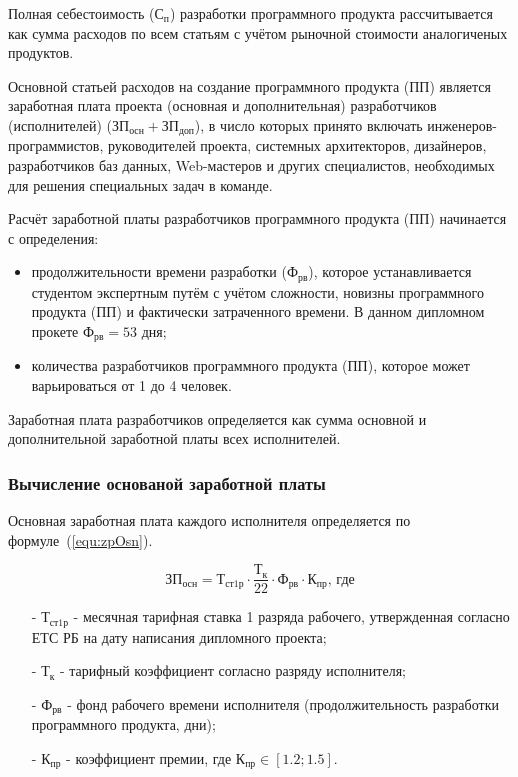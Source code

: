 Полная себестоимость ($\text{С}_{\text{п}}$) разработки программного продукта рассчитывается как сумма расходов
по всем статьям с учётом рыночной стоимости аналогиченых продуктов.

Основной статьей расходов на создание программного продукта (ПП) является заработная плата проекта
(основная и дополнительная) разработчиков (исполнителей)
($\text{ЗП}_{\text{осн}} + \text{ЗП}_{\text{доп}}$),
в число которых принято включать инженеров-программистов,
руководителей проекта, системных архитекторов, дизайнеров, разработчиков баз данных,
Web-мастеров и других специалистов, необходимых для решения специальных задач в команде.

Расчёт заработной платы разработчиков программного продукта (ПП) начинается с определения:

\begin{itemize}
    \item продолжительности времени разработки ($\text{Ф}_{\text{рв}}$),
    которое устанавливается студентом экспертным путём с учётом сложности,
    новизны программного продукта (ПП) и фактически затраченного времени.
    В данном дипломном прокете $\text{Ф}_{\text{рв}} = 53\text{ дня}$;
    \item количества разработчиков программного продукта (ПП), которое может варьироваться от 1 до 4 человек.
\end{itemize}

Заработная плата разработчиков определяется как сумма основной и дополнительной заработной платы всех исполнителей.

\subsubsection*{Вычисление основаной заработной платы}

Основная заработная плата каждого исполнителя определяется по формуле~(\ref{equ:zpOsn}).

\begin{equation}
    \label{equ:zpOsn}
    \text{ЗП}_\text{осн} = \text{Т}_\text{ст1р} \cdot \frac{ \text{Т}_\text{к} }{ 22 } \cdot \text{Ф}_\text{рв} \cdot \text{К}_\text{пр} \text{, где}
\end{equation}

\begin{enumerate}
    \item[-] $\text{Т}_\text{ст1р}$ - месячная тарифная ставка 1 разряда рабочего,
    утвержденная согласно ЕТС РБ на дату написания дипломного проекта;
    \item[-] $\text{Т}_\text{к}$ - тарифный коэффициент согласно разряду исполнителя;
    \item[-] $\text{Ф}_\text{рв}$ - фонд рабочего времени исполнителя (продолжительность разработки программного продукта, дни);
    \item[-] $\text{К}_\text{пр}$ - коэффициент премии, где $\text{К}_\text{пр} \in [1.2; 1.5]$.
\end{enumerate}


